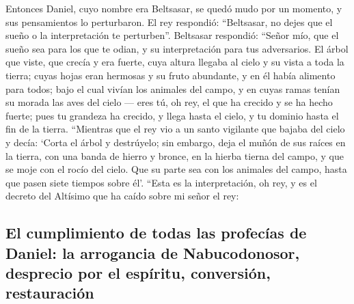 \begin{paracol}{2}
 Entonces Daniel, cuyo nombre era Beltsasar, se quedó
mudo por un momento, y sus pensamientos lo perturbaron. El rey
respondió: ``Beltsasar, no dejes que el sueño o la interpretación te
perturben''. Beltsasar respondió: ``Señor mío, que el sueño sea para los
que te odian, y su interpretación para tus adversarios. 
El árbol que viste, que crecía y era fuerte, cuya altura llegaba al
cielo y su vista a toda la tierra;  cuyas hojas eran
hermosas y su fruto abundante, y en él había alimento para todos; bajo
el cual vivían los animales del campo, y en cuyas ramas tenían su morada
las aves del cielo ---  eres tú, oh rey, el que ha
crecido y se ha hecho fuerte; pues tu grandeza ha crecido, y llega hasta
el cielo, y tu dominio hasta el fin de la tierra. 
``Mientras que el rey vio a un santo vigilante que bajaba del cielo y
decía: `Corta el árbol y destrúyelo; sin embargo, deja el muñón de sus
raíces en la tierra, con una banda de hierro y bronce, en la hierba
tierna del campo, y que se moje con el rocío del cielo. Que su parte sea
con los animales del campo, hasta que pasen siete tiempos sobre él'.
 ``Esta es la interpretación, oh rey, y es el decreto del
Altísimo que ha caído sobre mi señor el rey:

\hypertarget{el-cumplimiento-de-todas-las-profecuxedas-de-daniel-la-arrogancia-de-nabucodonosor-desprecio-por-el-espuxedritu-conversiuxf3n-restauraciuxf3n}{%
\subsection{El cumplimiento de todas las profecías de Daniel: la
arrogancia de Nabucodonosor, desprecio por el espíritu, conversión,
restauración}\label{el-cumplimiento-de-todas-las-profecuxedas-de-daniel-la-arrogancia-de-nabucodonosor-desprecio-por-el-espuxedritu-conversiuxf3n-restauraciuxf3n}}


\end{paracol}
